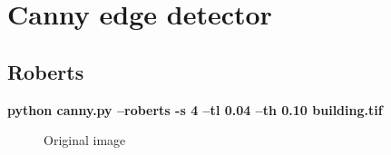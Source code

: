 \pagebreak

\section{Canny edge detector}

\subsection{Roberts}

    \textbf{python canny.py --roberts -s 4 --tl 0.04 --th 0.10 building.tif}

    \begin{figure}[!htb]\centering
        \begin{minipage}{0.8\textwidth}
            \caption{\small{Original image}}\label{diagram:building}
        \end{minipage}
    \end{figure}


